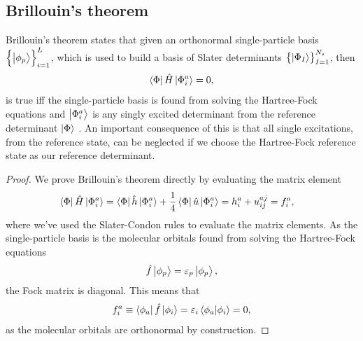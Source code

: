         \subsection{Brillouin's theorem}
            Brillouin's theorem states that given an orthonormal single-particle
            basis $\left\{ \ket{\phi_p} \right\}_{i = 1}^{L}$, which is used to build a basis of
            Slater determinants $\left\{ \ket{\Phi_I} \right\}_{I = 1}^{N_s}$, then
            \begin{align}
                \bra{\Phi}\hat{H}\ket{\Phi^{a}_{i}} = 0,
            \end{align}
            is true iff the single-particle basis is found from solving the
            Hartree-Fock equations and $\ket{\Phi^{a}_{i}}$ is any singly
            excited determinant from the reference determinant $\ket{\Phi}$
            \cite{kvaal2017notes}.
            An important consequence of this is that all single excitations,
            from the reference state, can be neglected if we choose the
            Hartree-Fock reference state as our reference determinant.
            \begin{proof}
                We prove Brillouin's theorem directly by evaluating the matrix
                element
                \begin{align}
                    \bra{\Phi}\hat{H}\ket{\Phi^{a}_{i}}
                    &= \bra{\Phi}\hat{h}\ket{\Phi^{a}_{i}}
                    + \frac{1}{4}\bra{\Phi}\hat{u}\ket{\Phi^{a}_{i}}
                    = h^{a}_{i} + u^{aj}_{ij}
                    = f^{a}_{i},
                \end{align}
                where we've used the Slater-Condon rules to evaluate the matrix
                elements.
                As the single-particle basis is the molecular orbitals found
                from solving the Hartree-Fock equations
                \begin{align}
                    \hat{f}\ket{\phi_p} = \varepsilon_p\ket{\phi_p},
                \end{align}
                the Fock matrix is diagonal.
                This means that
                \begin{align}
                    f^{a}_{i}
                    \equiv
                    \bra{\phi_a}\hat{f}\ket{\phi_i}
                    = \varepsilon_i\braket{\phi_a}{\phi_i}
                    = 0,
                \end{align}
                as the molecular orbitals are orthonormal by construction.
            \end{proof}



